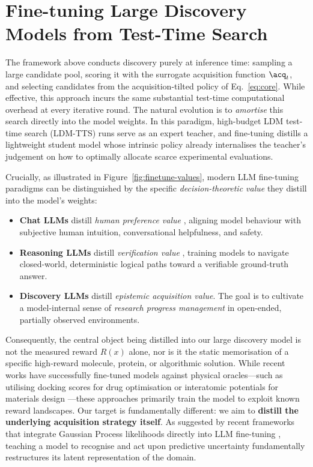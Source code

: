 



\section{Fine-tuning Large Discovery Models from Test-Time Search}
\label{sec:ldm-finetune}

The framework above conducts discovery purely at inference time: sampling a large candidate pool, scoring it with the surrogate acquisition function $\acq_t$, and selecting candidates from the acquisition-tilted policy of Eq.~\eqref{eq:core}. While effective, this approach incurs the same substantial test-time computational overhead at every iterative round. The natural evolution is to \emph{amortise} this search directly into the model weights. In this paradigm, high-budget LDM test-time search (LDM-TTS) runs serve as an expert teacher, and fine-tuning distills a lightweight student model whose intrinsic policy already internalises the teacher's judgement on how to optimally allocate scarce experimental evaluations.




Crucially, as illustrated in Figure~\ref{fig:finetune-values}, modern LLM fine-tuning paradigms can be distinguished by the specific \emph{decision-theoretic value} they distill into the model's weights:
\begin{itemize}
    \item \textbf{Chat LLMs} distill \emph{human preference value} \citep{bai2022constitutional,rafailov2023direct}, aligning model behaviour with subjective human intuition, conversational helpfulness, and safety.
    \item \textbf{Reasoning LLMs} distill \emph{verification value} \citep{zelikman2022star}, training models to navigate closed-world, deterministic logical paths toward a verifiable ground-truth answer.
    \item \textbf{Discovery LLMs} distill \emph{epistemic acquisition value}. The goal is to cultivate a model-internal sense of \emph{research progress management} in open-ended, partially observed environments.
\end{itemize}

Consequently, the central object being distilled into our large discovery model is not the measured reward $R(x)$ alone, nor is it the static memorisation of a specific high-reward molecule, protein, or algorithmic solution. While recent works have successfully fine-tuned models against physical oracles—such as utilising docking scores for drug optimisation \citep{liu2025drugimprovergpt} or interatomic potentials for materials design \citep{cao2026reinforcement}—these approaches primarily train the model to exploit known reward landscapes. Our target is fundamentally different: we aim to \textbf{distill the underlying acquisition strategy itself}. As suggested by recent frameworks that integrate Gaussian Process likelihoods directly into LLM fine-tuning \citep{rankovic2025gollum}, teaching a model to recognise and act upon predictive uncertainty fundamentally restructures its latent representation of the domain.

